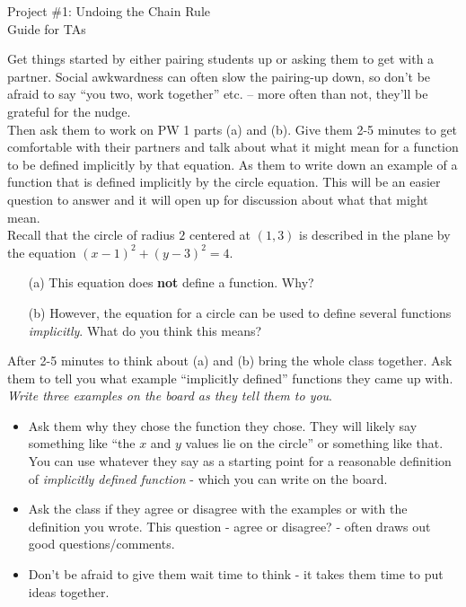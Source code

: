 \documentclass[epsf]{article}
\begin{document}
\newcommand{\R}{\mathbb{R}}
\newcommand{\noi}{\noindent}
\newcommand{\bs}{\bigskip}



\begin{center}
{\Large Project \#1: Undoing the Chain Rule\\
\vskip 2mm
Guide for TAs}
\end{center}


\noi {\bf 1. }Get things started by either pairing students up or asking them to get with a partner.  Social awkwardness can often slow the pairing-up down, so don't be afraid to say ``you two, work together'' etc. -- more often than not, they'll be grateful for the nudge.\\

\vskip 2mm
\noi{\bf 2. } Then ask them to work on PW 1 parts (a) and (b).  Give them 2-5 minutes to get comfortable with their partners and talk about what it might mean for a function to be defined implicitly by that equation.  As them to write down an example of a function that is defined implicitly by the circle equation.  This will be an easier question to answer and it will open up for discussion about what that might mean.\\

\noi{\bf PW 1}  Recall that the circle of radius $2$ centered at $(1,3)$
is described in the plane by the equation
$(x-1)^2+(y-3)^2=4.$
\begin{itemize}
\item[(a)]  This equation does {\bf not} define a function.  Why?

\item[(b)]  However, the equation for a circle can be used to define several functions {\em implicitly}.  What do you think this means?
\end{itemize}

\noi{\bf 3.} After 2-5 minutes to think about (a) and (b) bring the whole class together.  Ask them to tell you what example ``implicitly defined'' functions they came up with.  \textit{Write three examples on the board as they tell them to you}.  
\begin{itemize}
\item Ask them why they chose the function they chose.  They will likely say something like ``the $x$ and $y$ values lie on the circle'' or something like that.  You can use whatever they say as a starting point for a reasonable definition of \textit{implicitly defined function} - which you can write on the board.  
\item Ask the class if they agree or disagree with the examples or with the definition you wrote.  This question - agree or disagree? - often draws out good questions/comments.
\item Don't be afraid to give them wait time to think - it takes them time to put ideas together.
\end{itemize}
\vskip 2mm
\end{document}
